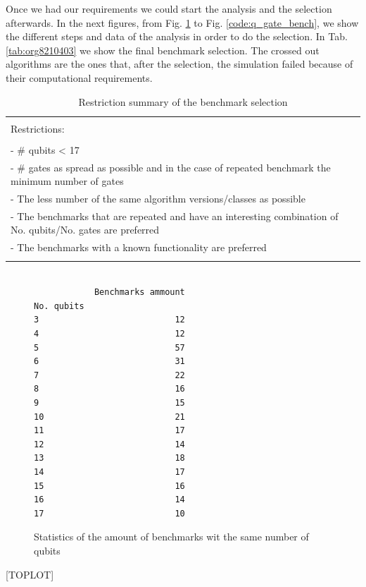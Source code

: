 Once we had our requirements we could start the analysis and the selection afterwards.
In the next figures, from Fig. \ref{code:no_q_statistics} to Fig. \ref{code:q_gate_bench}, we show the different steps and data of the analysis in order to do the selection.
In Tab. \ref{tab:org8210403} we show the final benchmark selection.
The crossed out algorithms are the ones that, after the selection, the simulation failed because of their computational requirements.
\begin{table}[htbp]
\caption{\label{tab:org34e41df}
Restriction summary of the benchmark selection}
\centering
\begin{tabular}{|l|}
\hline
\\
Restrictions:\\
\\
- \# qubits < 17\\
- \# gates as spread as possible and in the case of repeated benchmark the minimum number of gates\\
- The less number of the same algorithm versions/classes as possible\\
- The benchmarks that are repeated and have an interesting combination of No. qubits/No. gates are  preferred\\
- The benchmarks with a known functionality are preferred\\
\\
\hline
\end{tabular}
\end{table}

\begin{figure}
\centering

\begin{verbatim}

            Benchmarks ammount
No. qubits
3                           12
4                           12
5                           57
6                           31
7                           22
8                           16
9                           15
10                          21
11                          17
12                          14
13                          18
14                          17
15                          16
16                          14
17                          10

\end{verbatim}


\label{code:no_q_statistics}
\caption{Statistics of the amount of benchmarks wit the same number of qubits}
\end{figure}
[TOPLOT]

